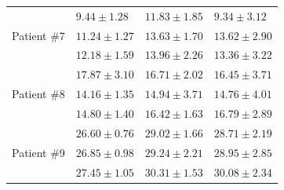 \documentclass[journal,twoside,web]{ieeecolor}
\begin{document}
\begin{table}[h!]
\begin{tabular}{m{} m{} m{} m{}}
		\hline
		\multirow[t]{3}{*}{Patient \#7}   
		& $ 9.44 \pm 1.28$ & $11.83 \pm 1.85$ & $ 9.34 \pm 3.12$ \\ %
		& $11.24 \pm 1.27$ & $13.63 \pm 1.70$ & $13.62 \pm 2.90$ \\
		& $12.18 \pm 1.59$ & $13.96 \pm 2.26$ & $13.36 \pm 3.22$ \\
		\hline
		\multirow[t]{3}{*}{Patient \#8}   
		& $17.87 \pm 3.10$ & $16.71 \pm 2.02$ & $16.45 \pm 3.71$ \\ %
		& $14.16 \pm 1.35$ & $14.94 \pm 3.71$ & $14.76 \pm 4.01$ \\
		& $14.80 \pm 1.40$ & $16.42 \pm 1.63$ & $16.79 \pm 2.89$ \\
		\hline
		\multirow[t]{3}{*}{Patient \#9}   
		& $26.60 \pm 0.76$ & $29.02 \pm 1.66$ & $28.71 \pm 2.19$ \\ %
		& $26.85 \pm 0.98$ & $29.24 \pm 2.21$ & $28.95 \pm 2.85$ \\
		& $27.45 \pm 1.05$ & $30.31 \pm 1.53$ & $30.08 \pm 2.34$ \\
		\bottomrule
	\end{tabular}
\end{table}
\end{document}
